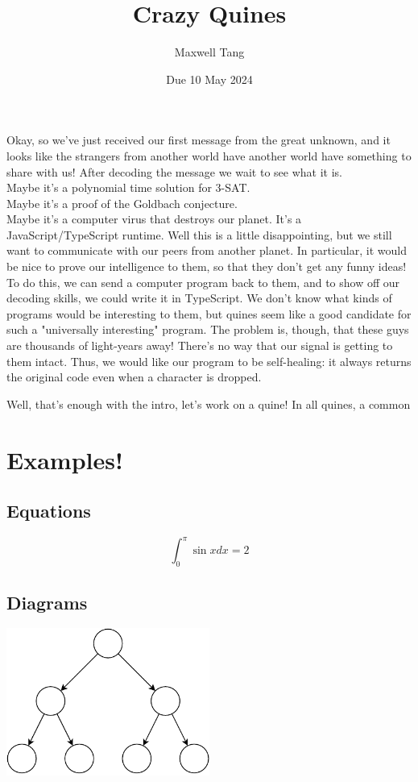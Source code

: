 \documentclass{article}
\title{Crazy Quines}
\author{Maxwell Tang}
\date{Due 10 May 2024}
\begin{document}
\maketitle
Okay, so we've just received our first message from the great unknown,
    and it looks like the strangers from another world have another world have something to share with us!
After decoding the message we wait to see what it is. \vspace*{0.25cm}
\\Maybe it's a polynomial time solution for 3-SAT.
\\Maybe it's a proof of the Goldbach conjecture.
\\Maybe it's a computer virus that destroys our planet.
\bigbreak
It's a JavaScript/TypeScript runtime.
\bigbreak
Well this is a little disappointing, but we still want to communicate with our peers from another planet.
In particular, it would be nice to prove our intelligence to them, so that they don't get any funny ideas!
To do this, we can send a computer program back to them, and to show off our decoding skills, we could write it in TypeScript.
We don't know what kinds of programs would be interesting to them, but quines seem like a good candidate for such a "universally interesting" program.
The problem is, though, that these guys are thousands of light-years away!
There's no way that our signal is getting to them intact.
Thus, we would like our program to be self-healing: it always returns the original code even when a character is dropped.

Well, that's enough with the intro, let's work on a quine!
In all quines, a common 








\section*{Examples!}

\subsection*{Equations}
$$\int_{0}^{\pi}\sin x dx = 2$$

\subsection*{Diagrams}
\begin{center}
    \includegraphics[width=0.5\textwidth]{example-figure.pdf}
\end{center}
\end{document}
